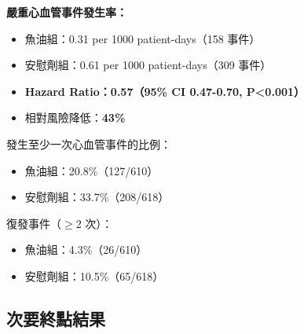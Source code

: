 \documentclass[12pt,a4paper]{article}
\begin{document}
\begin{tcolorbox}[
    colback=emergency_red!5!white,
    colframe=emergency_red,
    title=\textbf{主要終點結果},
    fonttitle=\bfseries
]
\textbf{嚴重心血管事件發生率：}
\begin{itemize}
    \item 魚油組：0.31 per 1000 patient-days（158 事件）
    \item 安慰劑組：0.61 per 1000 patient-days（309 事件）
    \item \textbf{Hazard Ratio：0.57（95\% CI 0.47-0.70, P<0.001）}
    \item 相對風險降低：\textbf{43\%}
\end{itemize}
\end{tcolorbox}

發生至少一次心血管事件的比例：
\begin{itemize}
    \item 魚油組：20.8\%（127/610）
    \item 安慰劑組：33.7\%（208/618）
\end{itemize}

復發事件（$\geq$2 次）：
\begin{itemize}
    \item 魚油組：4.3\%（26/610）
    \item 安慰劑組：10.5\%（65/618）
\end{itemize}

\subsection{次要終點結果}
\end{document}
